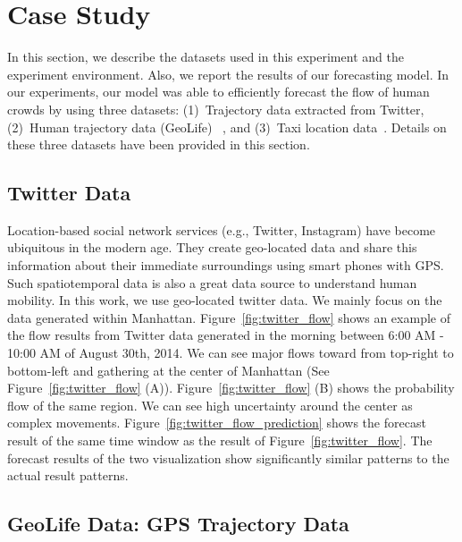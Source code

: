 \section{Case Study}

In this section, we describe the datasets used in this experiment and the experiment environment.
Also, we report the results of our forecasting model.
In our experiments, our model was able to efficiently forecast the flow of human crowds by using three datasets: (1)~Trajectory data extracted from Twitter, (2)~Human trajectory data (GeoLife) ~\cite{Zheng:2009:Mining}, and (3)~Taxi location data~\cite{NYC:2016:Taxi}.
Details on these three datasets have been provided in this section. 

\subsection{Twitter Data}
Location-based social network services (e.g., Twitter, Instagram) have become ubiquitous in the modern age.
They create geo-located data and share this information about their immediate surroundings using smart phones with GPS.
Such spatiotemporal data is also a great data source to understand human mobility.
In this work, we use geo-located twitter data.
We mainly focus on the data generated within Manhattan.
Figure~\ref{fig:twitter_flow} shows an example of the flow results from Twitter data generated in the morning between 6:00 AM - 10:00 AM of August 30th, 2014.
We can see major flows toward from top-right to bottom-left and gathering at the center of Manhattan (See Figure~\ref{fig:twitter_flow} (A)).
Figure~\ref{fig:twitter_flow} (B) shows the probability flow of the same region.
We can see high uncertainty around the center as complex movements.
Figure~\ref{fig:twitter_flow_prediction} shows the forecast result of the same time window as the result of Figure~\ref{fig:twitter_flow}.
The forecast results of the two visualization show significantly similar patterns to the actual result patterns.



\subsection{GeoLife Data: GPS Trajectory Data}

